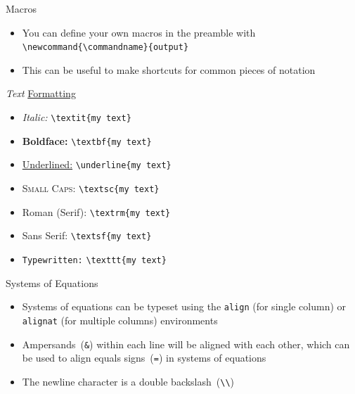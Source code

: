 \documentclass{beamer} %
\begin{document}
\begin{frame}{Macros}

\begin{itemize}
	\item You can define your own macros in the preamble with {\tt \textbackslash newcommand\{\textbackslash commandname\}\{output\}}
	\item This can be useful to make shortcuts for common pieces of notation
\end{itemize}

\end{frame}

\begin{frame}{\textit{Text} \underline{Formatting}}

\begin{itemize}
	\item \textit{Italic:} {\tt \textbackslash textit\{my text\}}
	\item \textbf{Boldface:} {\tt \textbackslash textbf\{my text\}}
	\item \underline{Underlined:} {\tt \textbackslash underline\{my text\}}
	\item \textsc{Small Caps:} {\tt \textbackslash textsc\{my text\}}
	\item \textrm{Roman (Serif):} {\tt \textbackslash textrm\{my text\}}
	\item \textsf{Sans Serif:} {\tt \textbackslash textsf\{my text\}}
	\item \texttt{Typewritten:} {\tt \textbackslash texttt\{my text\}}
\end{itemize}

\end{frame}

\begin{frame}{Systems of Equations}

\begin{itemize}
	\item Systems of equations can be typeset using the \texttt{align} (for single column) or \texttt{alignat} (for multiple columns) environments
	\item Ampersands~({\tt \&}) within each line will be aligned with each other, which can be used to align equals signs~({\tt =}) in systems of equations
	\item The newline character is a double backslash~({\tt \textbackslash \textbackslash})
\end{itemize}

\end{frame}
\end{document}
